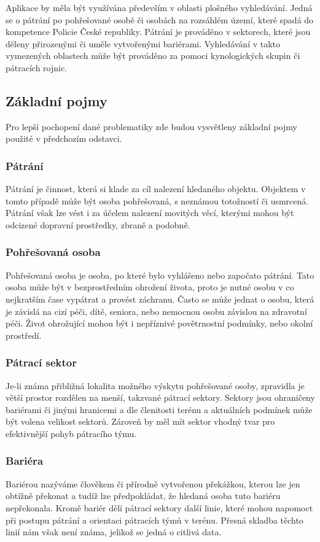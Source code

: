Aplikace by měla být využívána především v oblasti plošného
vyhledávání. Jedná se o pátrání po pohřešované osobě či osobách na
rozsáhlém území, které spadá do kompetence Policie České
republiky. Pátrání je prováděno v sektorech, které jsou děleny
přirozenými či uměle vytvořenými bariérami. Vyhledávání v takto
vymezených oblastech může být prováděno za pomoci kynologických skupin
či pátracích rojnic.
	
\subsection{Základní pojmy}
Pro lepší pochopení dané problematiky zde budou vysvětleny základní
pojmy použité v předchozím odstavci.
	
\subsubsection{Pátrání}
Pátrání je činnost, která si klade za cíl nalezení hledaného
objektu. Objektem v tomto případě může být osoba pohřešovaná, s
neznámou totožností či usmrcená. Pátrání však lze vést i za účelem
nalezení movitých věcí, kterými mohou být odcizené dopravní
prostředky, zbraně a podobně.

\subsubsection{Pohřešovaná osoba}
Pohřešovaná osoba je osoba, po které bylo vyhlášeno nebo započato
pátrání. Tato osoba může být v bezprostředním ohrožení života, proto
je nutné osobu v co nej\-krat\-ším čase vypátrat a provést
záchranu. Často se může jednat o osobu, která je závislá na cizí péči,
dítě, seniora, nebo nemocnou osobu závislou na zdravotní péči. Život
ohrožující mohou být i nepříznivé povětrnostní podmínky, nebo okolní
prostředí.
	
\subsubsection{Pátrací sektor}
Je-li známa přibližná lokalita možného výskytu pohřešované osoby,
zpravidla je větší prostor rozdělen na menší, takzvané pátrací
sektory. Sektory jsou ohraničeny ba\-ri\-é\-ra\-mi či jinými hranicemi
a dle členitosti terénu a aktuálních podmínek může být volena velikost
sektorů. Zároveň by měl mít sektor vhodný tvar pro efektivnější pohyb
pátracího týmu.
	
\subsubsection{Bariéra}
Bariérou nazýváme člověkem či přírodně vytvořenou překážkou, kterou
lze jen obtížně překonat a tudíž lze předpokládat, že hledaná osoba
tuto bariéru nepřekonala. Kromě bariér dělí pátrací sektory další
linie, které mohou napomoct při postupu pátrání a orientaci pátracích
týmů v terénu. Přesná skladba těchto linií nám však není známa,
jelikož se jedná o citlivá data.

